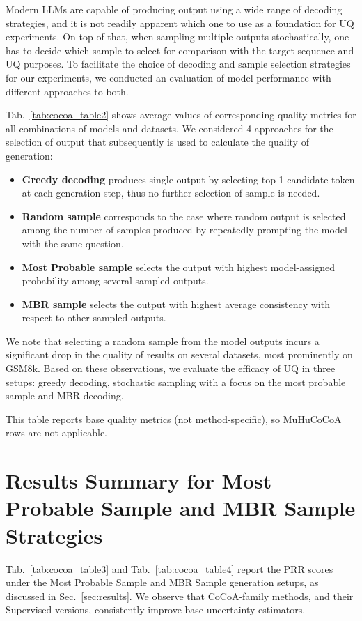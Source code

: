 \documentclass[11pt]{article}
\newcommand{\method}{MuHuCoCoA}
\newcommand{\tabref}[1]{Tab.~\ref{#1}}
\newcommand{\secref}[1]{Sec.~\ref{#1}}
\begin{document}
Modern LLMs are capable of producing output using a wide range of decoding strategies, and it is not readily apparent which one to use as a foundation for UQ experiments. On top of that, when sampling multiple outputs stochastically, one has to decide which sample to select for comparison with the target sequence and UQ purposes. To facilitate the choice of decoding and sample selection strategies for our experiments, we conducted an evaluation of model performance with different approaches to both.

\tabref{tab:cocoa_table2} shows average values of corresponding quality metrics for all combinations of models and datasets. We considered 4 approaches for the selection of output that subsequently is used to calculate the quality of generation:

\begin{itemize}
  \item \textbf{Greedy decoding} produces single output by selecting top-1 candidate token at each generation step, thus no further selection of sample is needed.
  \item \textbf{Random sample} corresponds to the case where random output is selected among the number of samples produced by repeatedly prompting the model with the same question.
  \item \textbf{Most Probable sample} selects the output with highest model-assigned probability among several sampled outputs.
  \item \textbf{MBR sample} selects the output with highest average consistency with respect to other sampled outputs.
\end{itemize}

We note that selecting a random sample from the model outputs incurs a significant drop in the quality of results on several datasets, most prominently on GSM8k. Based on these observations, we evaluate the efficacy of UQ in three setups: greedy decoding, stochastic sampling with a focus on the most probable sample and MBR decoding.

This table reports base quality metrics (not method-specific), so \method{} rows are not applicable.


\section{Results Summary for Most Probable Sample and MBR Sample Strategies}
\label{app:best_sample_mbr}

\tabref{tab:cocoa_table3} and \tabref{tab:cocoa_table4} report the PRR scores under the Most Probable Sample and MBR Sample generation setups, as discussed in \secref{sec:results}. We observe that CoCoA-family methods, and their Supervised versions, consistently improve base uncertainty estimators.
\end{document}
